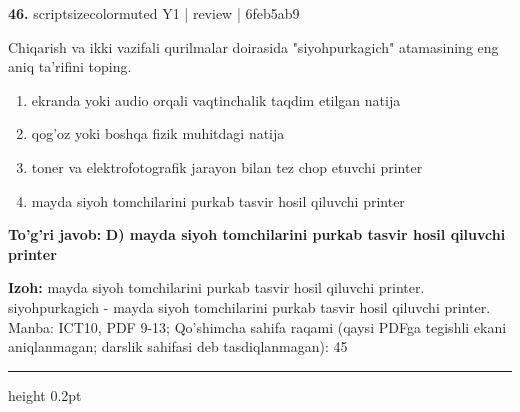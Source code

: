 \documentclass[10pt,a4paper]{article}
\begin{document}
{\bfseries\sffamily\color{ink} 46.} {scriptsizecolor{muted} Y1 | review | 6feb5ab9}
\par
Chiqarish va ikki vazifali qurilmalar doirasida "siyohpurkagich" atamasining eng aniq ta'rifini toping.
\begin{enumerate}[label=\Alph*),leftmargin=9mm]
\item ekranda yoki audio orqali vaqtinchalik taqdim etilgan natija
\item qog'oz yoki boshqa fizik muhitdagi natija
\item toner va elektrofotografik jarayon bilan tez chop etuvchi printer
\item mayda siyoh tomchilarini purkab tasvir hosil qiluvchi printer
\end{enumerate}
\begin{tcolorbox}[enhanced,breakable,colback=teal!4,colframe=teal!60!black,boxrule=0.45pt,arc=1.2mm,left=2.7mm,right=2.7mm,top=1.8mm,bottom=1.8mm,before skip=2mm,after skip=2mm]
{\bfseries\sffamily\color{teal}To'g'ri javob:} \textbf{D) mayda siyoh tomchilarini purkab tasvir hosil qiluvchi printer}
\par\smallskip
{\bfseries Izoh:} mayda siyoh tomchilarini purkab tasvir hosil qiluvchi printer. siyohpurkagich - mayda siyoh tomchilarini purkab tasvir hosil qiluvchi printer. Manba: ICT10, PDF 9-13; Qo'shimcha sahifa raqami (qaysi PDFga tegishli ekani aniqlanmagan; darslik sahifasi deb tasdiqlanmagan): 45
\end{tcolorbox}
\vspace{2mm}\hrule height 0.2pt\vspace{3mm}
\end{document}
